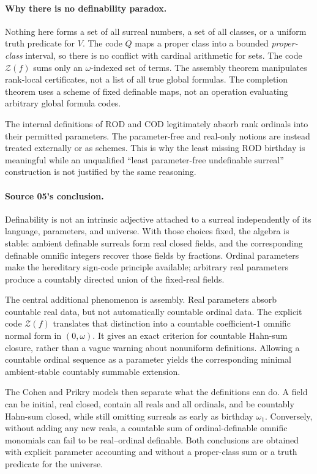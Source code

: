 \documentclass[11pt,a4paper]{article}
\numberwithin{equation}{section}
\theoremstyle{definition}
\theoremstyle{remark}
\newcommand{\ROD}{\mathrm{ROD}}
\newcommand{\COD}{\mathrm{COD}}
\newcommand{\Zc}{\mathcal Z}
\begin{document}
\paragraph{Why there is no definability paradox.}
Nothing here forms a set of all surreal numbers, a set of all classes,
or a uniform truth predicate for $V$. The code $Q$ maps a proper class
into a bounded \emph{proper-class} interval, so there is no conflict
with cardinal arithmetic for sets. The code $\Zc(f)$ sums only an
$\omega$-indexed set of terms. The assembly theorem manipulates
rank-local certificates, not a list of all true global formulas.
The completion theorem uses a scheme of fixed definable maps, not an
operation evaluating arbitrary global formula codes.

The internal definitions of $\ROD$ and $\COD$ legitimately absorb
rank ordinals into their permitted parameters. The parameter-free
and real-only notions are instead treated externally or as schemes.
This is why the least missing $\ROD$ birthday is meaningful while an
unqualified ``least parameter-free undefinable surreal'' construction
is not justified by the same reasoning.

\paragraph{Source 05's conclusion.}
Definability is not an intrinsic adjective attached to a surreal
independently of its language, parameters, and universe. With those
choices fixed, the algebra is stable: ambient definable surreals form
real closed fields, and the corresponding definable omnific integers
recover those fields by fractions. Ordinal parameters make the
hereditary sign-code principle available; arbitrary real parameters
produce a countably directed union of the fixed-real fields.

The central additional phenomenon is assembly. Real parameters absorb
countable real data, but not automatically countable ordinal data.
The explicit code $\Zc(f)$ translates that distinction into a
countable coefficient-$1$ omnific normal form in $(0,\omega)$.
It gives an exact criterion for countable Hahn-sum closure, rather
than a vague warning about nonuniform definitions. Allowing a
countable ordinal sequence as a parameter yields the corresponding
minimal ambient-stable countably summable extension.

The Cohen and Prikry models then separate what the definitions can do.
A field can be initial, real closed, contain all reals and all ordinals,
and be countably Hahn-sum closed, while still omitting surreals as early
as birthday $\omega_1$. Conversely, without adding any new reals, a
countable sum of ordinal-definable omnific monomials can fail to be
real--ordinal definable. Both conclusions are obtained with explicit
parameter accounting and without a proper-class sum or a truth predicate
for the universe.
\end{document}
